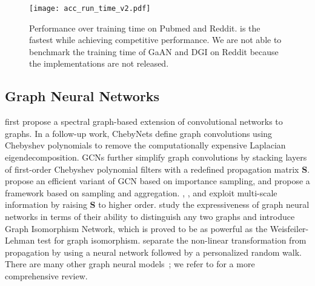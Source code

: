 
\begin{figure*}[tb!] 
\centering
\texttt{[image: acc\_run\_time\_v2.pdf]}
\caption{Performance over training time on Pubmed and Reddit. \method{} is the fastest while achieving competitive performance. 
We are not able to benchmark the training time of GaAN and DGI on Reddit because the implementations are not released. 
}
\label{fig:run_time}
\end{figure*}
%
\subsection{Graph Neural Networks}
\citet{Bruna13} first propose a spectral graph-based extension of convolutional networks to graphs. 
In a follow-up work, ChebyNets \cite{Defferrard16} define graph convolutions using Chebyshev polynomials to remove the computationally expensive Laplacian eigendecomposition. GCNs \cite{gcn} further simplify graph convolutions by stacking layers of first-order Chebyshev polynomial filters with a redefined propagation matrix $\mathbf{S}$. 
\citet{FastGCN} propose an efficient variant of GCN based on importance sampling, and \citet{Hamilton17} propose a framework based on sampling and aggregation. 
\citet{dcnn}, \citet{n-gcn}, and \citet{liao2018lanczosnet} exploit multi-scale information by raising $\mathbf{S}$ to higher order.
\citet{xu2018how} study the expressiveness of graph neural networks in terms of their ability to distinguish any two graphs and introduce Graph Isomorphism Network, which is proved to be as powerful as the Weisfeiler-Lehman test for graph isomorphism. 
\citet{Klicpera19} separate the non-linear transformation from propagation by using a neural network followed by a personalized random walk.
There are many other graph neural models~\cite{Monet, EP17, Li18}; we refer to \citet{gnn_review, battaglia2018relational, wu2019comprehensive} for a more comprehensive review. 


